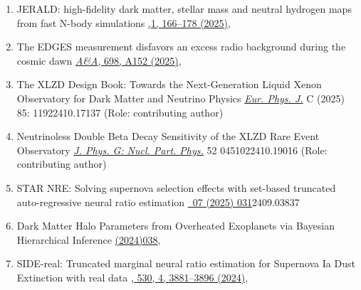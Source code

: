 \begin{enumerate}
\item  {}
{JERALD: high-fidelity dark matter, stellar mass and neutral hydrogen maps from fast N-body simulations}
{\href{https://doi.org/10.1093/mnras/staf948n}{,1, 166–178 (2025)}, } 

\item {}
{The EDGES measurement disfavors an excess radio background during the cosmic dawn}
{\href{https://doi.org/10.1051/0004-6361/202452982}{{\em A\&A}, 698, A152 (2025)}, } 

\item 
\onestar {}
{The XLZD Design Book: Towards the Next-Generation Liquid Xenon Observatory for Dark Matter and Neutrino Physics}
{{\em \href{https://doi.org/10.1140/epjc/s10052-025-14810-w.}{Eur. Phys. J.}} C (2025) 85: 1192}{2410.17137} (Role: contributing author)

\item {}
{Neutrinoless Double Beta Decay Sensitivity of the XLZD Rare Event Observatory}
{{\em \href{https://doi.org/10.1088/1361-6471/adb900}{J. Phys. G: Nucl. Part. Phys.}} 52 045102}{2410.19016}  (Role: contributing author)

\item {}
{STAR NRE: Solving supernova selection effects with set-based truncated auto-regressive neural ratio estimation}
{\href{https://doi.org/10.1088/1475-7516/2025/07/031}{\JCAP\ 07 (2025) 031}}{2409.03837} 

\item
{}
{Dark Matter Halo Parameters from Overheated Exoplanets via Bayesian Hierarchical Inference}
{\href{https://doi.org/10.1088/1475-7516/2024/07/038}{(2024)038},   }

\item 
{}
{SIDE-real: Truncated marginal neural ratio estimation for Supernova Ia Dust Extinction with real data}
{\href{https://doi.org/10.1093/mnras/stae995}{\mnras,  530, 4, 3881–3896 (2024)}, }


\end{enumerate}
